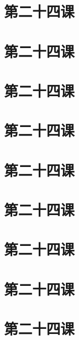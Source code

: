\documentclass[12pt,UTF8]{ctexbook}
\begin{document}
\section{第二十四课}

\section{第二十四课}

\section{第二十四课}

\section{第二十四课}

\section{第二十四课}

\section{第二十四课}

\section{第二十四课}

\section{第二十四课}

\section{第二十四课}
\end{document}

